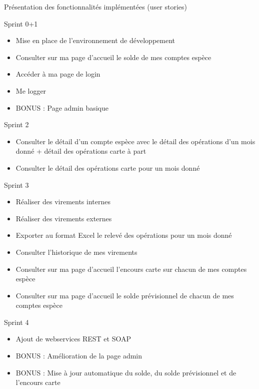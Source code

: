 \begin{frame}
	\begin{center}
		\huge{Pr\'esentation des fonctionnalit\'es impl\'ement\'ees (user stories) }
	\end{center}
\end{frame}

\begin{frame}{Sprint 0+1}
\begin{itemize}
	\item Mise en place de l'environnement de d\'eveloppement
	\item Consulter sur ma page d'accueil le solde de mes comptes esp\`ece
	\item Acc\'eder \`a ma page de login
	\item Me logger
	\item BONUS : Page admin basique
\end{itemize}
\end{frame}

\begin{frame}{Sprint 2}
\begin{itemize}
	\item Consulter le d\'etail d'un compte esp\`ece avec le d\'etail des op\'erations d'un mois donn\'e + d\'etail des op\'erations carte \`a part
	\item Consulter le d\'etail des op\'erations carte pour un mois donn\'e
\end{itemize}
\end{frame}

\begin{frame}{Sprint 3}
\begin{itemize}
	\item R\'ealiser des virements internes
	\item R\'ealiser des virements externes
	\item Exporter au format Excel le relev\'e des op\'erations pour un mois donn\'e
	\item Consulter l'historique de mes virements
	\item Consulter sur ma page d'accueil l'encours carte sur chacun de mes comptes esp\`ece
	\item Consulter sur ma page d'accueil le solde pr\'evisionnel de chacun de mes comptes esp\`ece
\end{itemize}
\end{frame}

\begin{frame}{Sprint 4}
\begin{itemize}
	\item Ajout de webservices REST et SOAP
	\item BONUS : Am\'elioration de la page admin
	\item BONUS : Mise \`a jour automatique du solde, du solde pr\'evisionnel et de l'encours carte 
\end{itemize}
\end{frame}

